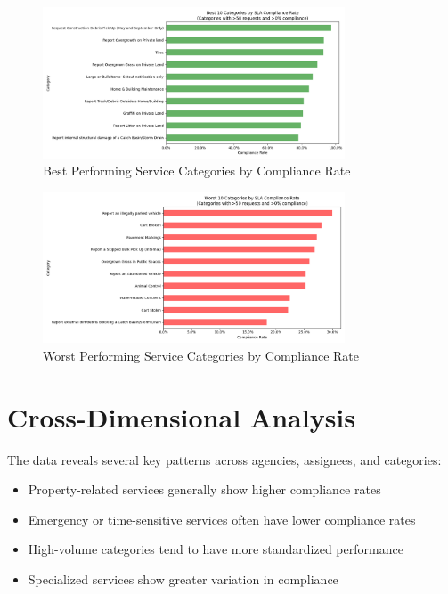 \documentclass[12pt]{report}
\begin{document}
\begin{figure}[H]
\centering
\includegraphics[width=0.8\textwidth]{best_performers_categories}
\caption{Best Performing Service Categories by Compliance Rate}
\label{fig:best_categories}
\end{figure}

\begin{figure}[H]
\centering
\includegraphics[width=0.8\textwidth]{worst_performers_categories}
\caption{Worst Performing Service Categories by Compliance Rate}
\label{fig:worst_categories}
\end{figure}

\section{Cross-Dimensional Analysis}
The data reveals several key patterns across agencies, assignees, and categories:

\begin{itemize}
    \item Property-related services generally show higher compliance rates
    \item Emergency or time-sensitive services often have lower compliance rates
    \item High-volume categories tend to have more standardized performance
    \item Specialized services show greater variation in compliance
\end{itemize}
\end{document}
